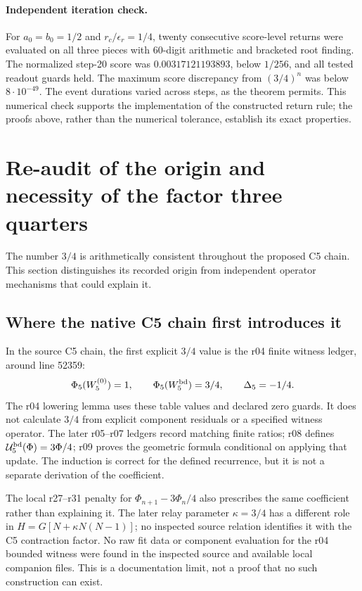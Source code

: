 \documentclass[11pt,a4paper]{article}
\begin{document}
\paragraph{Independent iteration check.}
For $a_0=b_0=1/2$ and $r_c/\epsilon_r=1/4$, twenty consecutive
score-level returns were evaluated on all three pieces with 60-digit
arithmetic and bracketed root finding. The normalized step-20 score was
$0.00317121193893$, below $1/256$, and all tested readout guards held.
The maximum score discrepancy from $(3/4)^n$ was below $8\cdot10^{-49}$.
The event durations varied across steps, as the theorem permits.
This numerical check supports the implementation of the constructed
return rule; the proofs above, rather than the numerical tolerance,
establish its exact properties.

\section{Re-audit of the origin and necessity of the factor three quarters}
\label{sec:three-quarter-origin-audit}
The number $3/4$ is arithmetically consistent throughout the proposed C5
chain. This section distinguishes its recorded origin from independent
operator mechanisms that could explain it.

\subsection{Where the native C5 chain first introduces it}
In the source C5 chain, the first explicit $3/4$ value is the r04 finite
witness ledger, around line 52359:
\[
\Phi_5(W_5^{(0)})=1,\qquad
\Phi_5(W_5^{\rm bd})=3/4,\qquad \Delta_5=-1/4.
\]
The r04 lowering lemma uses these table values and declared zero guards.
It does not calculate $3/4$ from explicit component residuals or a
specified witness operator. The later r05--r07 ledgers record matching
finite ratios; r08 defines $\mathcal U_5^{\rm bd}(\Phi)=3\Phi/4$;
r09 proves the geometric formula conditional on applying that update.
The induction is correct for the defined recurrence, but it is not a
separate derivation of the coefficient.

The local r27--r31 penalty for
$\Phi_{n+1}-3\Phi_n/4$ also prescribes the same coefficient rather than
explaining it. The later relay parameter $\kappa=3/4$ has a different
role in $H=G[N+\kappa N(N-1)]$; no inspected source relation identifies
it with the C5 contraction factor. No raw fit data or component evaluation
for the r04 bounded witness were found in the inspected source and
available local companion files. This is a documentation limit, not a
proof that no such construction can exist.
\end{document}
